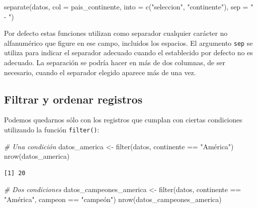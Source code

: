 \documentclass[
]{book}
\newenvironment{Shaded}{\begin{snugshade}}{\end{snugshade}}
\newcommand{\AttributeTok}[1]{\textcolor[rgb]{0.77,0.63,0.00}{#1}}
\newcommand{\CommentTok}[1]{\textcolor[rgb]{0.56,0.35,0.01}{\textit{#1}}}
\newcommand{\FunctionTok}[1]{\textcolor[rgb]{0.00,0.00,0.00}{#1}}
\newcommand{\NormalTok}[1]{#1}
\newcommand{\OtherTok}[1]{\textcolor[rgb]{0.56,0.35,0.01}{#1}}
\newcommand{\SpecialCharTok}[1]{\textcolor[rgb]{0.00,0.00,0.00}{#1}}
\newcommand{\StringTok}[1]{\textcolor[rgb]{0.31,0.60,0.02}{#1}}
\begin{document}
\begin{Shaded}
\begin{Highlighting}[]
\FunctionTok{separate}\NormalTok{(datos, }\AttributeTok{col =}\NormalTok{ pais\_continente, }\AttributeTok{into =} \FunctionTok{c}\NormalTok{(}\StringTok{"seleccion"}\NormalTok{, }\StringTok{"continente"}\NormalTok{), }\AttributeTok{sep =} \StringTok{" {-} "}\NormalTok{)}
\end{Highlighting}
\end{Shaded}

Por defecto estas funciones utilizan como separador cualquier carácter no alfanumérico que figure en ese campo, incluidos los espacios. El argumento \texttt{sep} se utiliza para indicar el separador adecuado cuando el establecido por defecto no es adecuado. La separación se podría hacer en más de dos columnas, de ser necesario, cuando el separador elegido aparece más de una vez.

\hypertarget{filtrar-y-ordenar-registros}{%
\subsection{Filtrar y ordenar registros}\label{filtrar-y-ordenar-registros}}

Podemos quedarnos sólo con los registros que cumplan con ciertas condiciones utilizando la función \texttt{filter()}:

\begin{Shaded}
\begin{Highlighting}[]
\CommentTok{\# Una condición}
\NormalTok{datos\_america }\OtherTok{\textless{}{-}} \FunctionTok{filter}\NormalTok{(datos, continente }\SpecialCharTok{==} \StringTok{"América"}\NormalTok{)}
\FunctionTok{nrow}\NormalTok{(datos\_america)}
\end{Highlighting}
\end{Shaded}

\begin{verbatim}
[1] 20
\end{verbatim}

\begin{Shaded}
\begin{Highlighting}[]
\CommentTok{\# Dos condiciones}
\NormalTok{datos\_campeones\_america }\OtherTok{\textless{}{-}} \FunctionTok{filter}\NormalTok{(datos, continente }\SpecialCharTok{==} \StringTok{"América"}\NormalTok{, campeon }\SpecialCharTok{==} \StringTok{"campeón"}\NormalTok{)}
\FunctionTok{nrow}\NormalTok{(datos\_campeones\_america)}
\end{Highlighting}
\end{Shaded}
\end{document}
